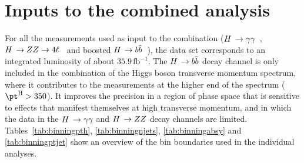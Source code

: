 \section{Inputs to the combined analysis}

For all the measurements used as input to the combination ($H\,\to\gamma\gamma$~\cite{CMS_AN_2017-299}, $H\,\to ZZ \to4\ell$~\cite{CMS_AN_2016-442} and boosted $H\,\to b\bar{b}$~\cite{CMS_AN_2016-366}), the data set corresponds to an integrated luminosity of about $35.9\,\text{fb}^{-1}$.
% 
% 
% 
% 
% 
The $H\,\to b\bar{b}$ decay channel is only included in the combination of the Higgs boson transverse momentum spectrum, where it contributes to the measurements at the higher end of the spectrum ($\pth > 350$\GeV).
% 
It improves the precision in a region of phase space that is sensitive to effects that manifest themselves at high transverse momentum, and in which the data in the $H\,\to\gamma\gamma$ and $H\,\to ZZ$ decay channels are limited.
% 
% 
% 
% 
% 
Tables~\ref{tab:binningpth}, \ref{tab:binningnjets}, \ref{tab:binningabsy} and \ref{tab:binningptjet} show an overview of the bin boundaries used in the individual analyses.
% 


